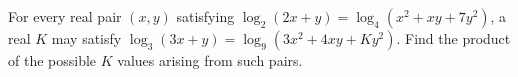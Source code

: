 For every real pair $(x,y)$ satisfying $\log_2(2x+y)=\log_4(x^2+xy+7y^2)$, a real $K$ may satisfy $\log_3(3x+y)=\log_9(3x^2+4xy+Ky^2)$. Find the product of the possible $K$ values arising from such pairs.
